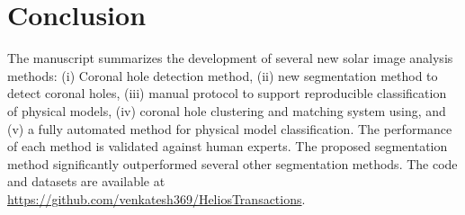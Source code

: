 \documentclass[journal]{IEEEtran}
\begin{document}

\section{Conclusion}\label{sec:conclusion}
The manuscript summarizes the development of several new solar image analysis methods:
  (i)   Coronal hole detection method,
  (ii)  new segmentation method to detect coronal holes, 
  (iii) manual protocol to support reproducible classification of physical models, 
  (iv)  coronal hole clustering and matching system using, and
  (v) a fully automated method for physical model classification. 
The performance of each method is validated against human experts. 
\color{blue}
The proposed segmentation method significantly outperformed several other segmentation methods.
The code and datasets are available at \url{https://github.com/venkatesh369/HeliosTransactions}.
\color{black}
\end{document}
